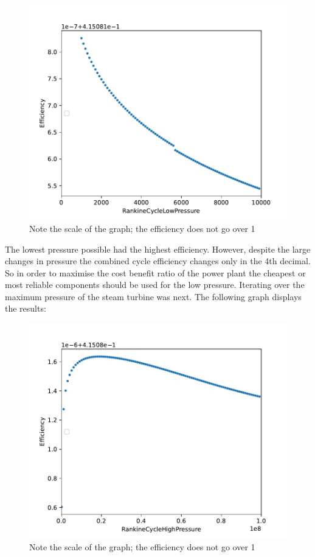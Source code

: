 \documentclass{article}
\begin{document}
\begin{figure}
    \centering
    \includegraphics{RankineLowPressureGraph.pdf}
    \caption{Note the scale of the graph; the efficiency does not go over 1}
    
    \label{fig:my_label}
\end{figure}

\FloatBarrier

The lowest pressure possible had the highest efficiency. However, despite the large changes in pressure the combined cycle efficiency changes only in the 4th decimal. So in order to maximise the cost benefit ratio of the power plant the cheapest or most reliable components should be used for the low pressure.
Iterating over the maximum pressure of the steam turbine was next. The following graph displays the results:

\begin{figure}
    \centering
    \includegraphics{RankineHighPressureGraph.pdf}
    \caption{Note the scale of the graph; the efficiency does not go over 1}
    
    \label{fig:my_label}
\end{figure}
\end{document}
